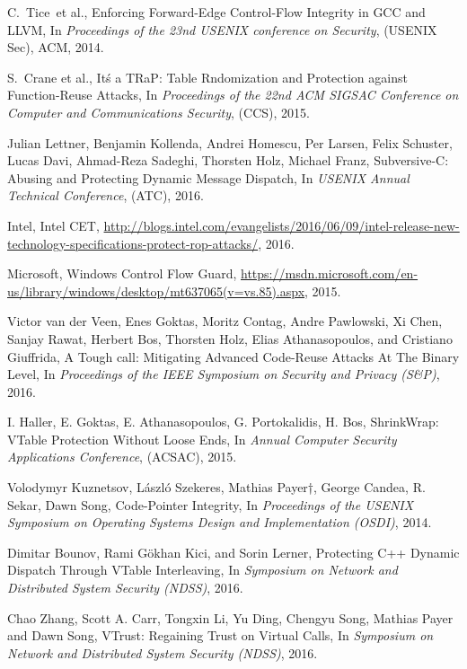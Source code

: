\documentclass[11pt,a4paper,bibtotoc,idxtotoc,headsepline,footsepline,footexclude,BCOR20mm,DIV10]{scrbook}
\begin{document}
\begin{thebibliography}{50}
C.~Tice~et al., {Enforcing Forward-Edge Control-Flow Integrity in GCC and LLVM}, In
\emph{Proceedings of the 23nd USENIX conference on Security}, (USENIX Sec), ACM, 2014.

S.~Crane et al., {It\'s a TRaP: Table Rndomization and Protection against Function-Reuse Attacks}, In
\emph{Proceedings of the 22nd ACM SIGSAC Conference on Computer and Communications Security}, (CCS), 2015.

Julian Lettner, Benjamin Kollenda, Andrei Homescu, Per Larsen, Felix Schuster,
Lucas Davi, Ahmad-Reza Sadeghi, Thorsten Holz, Michael Franz,
{Subversive-C: Abusing and Protecting Dynamic Message Dispatch}, In
\emph{USENIX Annual Technical Conference}, (ATC), 2016.

Intel, {Intel CET},
\url{http://blogs.intel.com/evangelists/2016/06/09/intel-release-new-technology-specifications-protect-rop-attacks/}, 2016.

Microsoft,
{Windows Control Flow Guard},
\url{https://msdn.microsoft.com/en-us/library/windows/desktop/mt637065(v=vs.85).aspx}, 2015.

Victor van der Veen, Enes Goktas, Moritz Contag, Andre Pawlowski, Xi Chen, Sanjay Rawat, 
Herbert Bos, Thorsten Holz, Elias Athanasopoulos, and Cristiano Giuffrida,
{A Tough call: Mitigating Advanced Code-Reuse Attacks At The Binary Level}, In
\emph{Proceedings of the IEEE Symposium on Security and Privacy (S\&P)}, 2016.

I. Haller, E. Goktas, E. Athanasopoulos, G. Portokalidis, H. Bos,
{ ShrinkWrap: VTable Protection Without Loose Ends}, In
\emph{Annual Computer Security Applications Conference}, (ACSAC), 2015.

Volodymyr Kuznetsov, László Szekeres, Mathias Payer†, George Candea, R. Sekar, Dawn Song,
{Code-Pointer Integrity}, In
\emph{Proceedings of the USENIX Symposium on Operating Systems Design and Implementation (OSDI)}, 2014.

Dimitar Bounov, Rami Gökhan Kici, and Sorin Lerner,
{Protecting C++ Dynamic Dispatch Through VTable Interleaving}, In
\emph{Symposium on Network and Distributed System Security (NDSS)}, 2016.

Chao Zhang, Scott A. Carr, Tongxin Li, Yu Ding, Chengyu Song, Mathias Payer and Dawn Song,
{VTrust: Regaining Trust on Virtual Calls}, In
\emph{Symposium on Network and Distributed System Security (NDSS)}, 2016.


\end{thebibliography}
\end{document}
